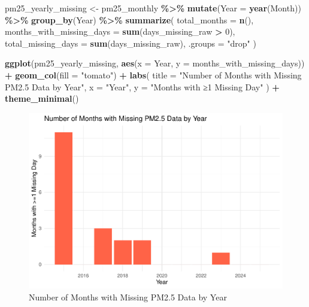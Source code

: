 \documentclass[
]{article}
\newenvironment{Shaded}{\begin{snugshade}}{\end{snugshade}}
\newcommand{\AttributeTok}[1]{\textcolor[rgb]{0.13,0.29,0.53}{#1}}
\newcommand{\DecValTok}[1]{\textcolor[rgb]{0.00,0.00,0.81}{#1}}
\newcommand{\FunctionTok}[1]{\textcolor[rgb]{0.13,0.29,0.53}{\textbf{#1}}}
\newcommand{\NormalTok}[1]{#1}
\newcommand{\OtherTok}[1]{\textcolor[rgb]{0.56,0.35,0.01}{#1}}
\newcommand{\SpecialCharTok}[1]{\textcolor[rgb]{0.81,0.36,0.00}{\textbf{#1}}}
\newcommand{\StringTok}[1]{\textcolor[rgb]{0.31,0.60,0.02}{#1}}
\begin{document}
\begin{Shaded}
\begin{Highlighting}[]
\NormalTok{pm25\_yearly\_missing }\OtherTok{\textless{}{-}}\NormalTok{ pm25\_monthly }\SpecialCharTok{\%\textgreater{}\%}
  \FunctionTok{mutate}\NormalTok{(}\AttributeTok{Year =} \FunctionTok{year}\NormalTok{(Month)) }\SpecialCharTok{\%\textgreater{}\%}
  \FunctionTok{group\_by}\NormalTok{(Year) }\SpecialCharTok{\%\textgreater{}\%}
  \FunctionTok{summarize}\NormalTok{(}
    \AttributeTok{total\_months =} \FunctionTok{n}\NormalTok{(),}
    \AttributeTok{months\_with\_missing\_days =} \FunctionTok{sum}\NormalTok{(days\_missing\_raw }\SpecialCharTok{\textgreater{}} \DecValTok{0}\NormalTok{),}
    \AttributeTok{total\_missing\_days =} \FunctionTok{sum}\NormalTok{(days\_missing\_raw),}
    \AttributeTok{.groups =} \StringTok{"drop"}
\NormalTok{  )}

\FunctionTok{ggplot}\NormalTok{(pm25\_yearly\_missing, }\FunctionTok{aes}\NormalTok{(}\AttributeTok{x =}\NormalTok{ Year, }\AttributeTok{y =}\NormalTok{ months\_with\_missing\_days)) }\SpecialCharTok{+}
  \FunctionTok{geom\_col}\NormalTok{(}\AttributeTok{fill =} \StringTok{"tomato"}\NormalTok{) }\SpecialCharTok{+}
  \FunctionTok{labs}\NormalTok{(}
    \AttributeTok{title =} \StringTok{"Number of Months with Missing PM2.5 Data by Year"}\NormalTok{,}
    \AttributeTok{x =} \StringTok{"Year"}\NormalTok{,}
    \AttributeTok{y =} \StringTok{"Months with ≥1 Missing Day"}
\NormalTok{  ) }\SpecialCharTok{+}
  \FunctionTok{theme\_minimal}\NormalTok{()}
\end{Highlighting}
\end{Shaded}

\begin{figure}
\centering
\includegraphics{Project_Report_files/figure-latex/pm25-missing-by-year-1.pdf}
\caption{Number of Months with Missing PM2.5 Data by Year}
\end{figure}
\end{document}
